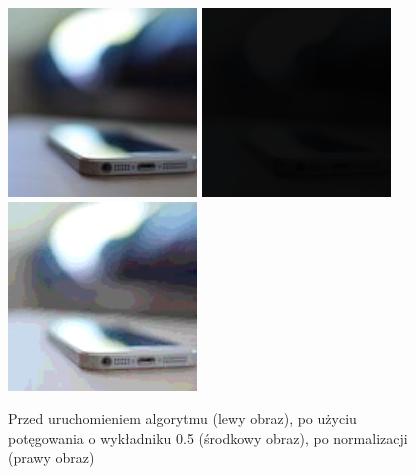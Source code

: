 \documentclass[a4paper,12pt]{book}
\begin{document}
\begin{figure}[H]
	\caption{Przed uruchomieniem algorytmu (lewy obraz), po użyciu potęgowania o wykładniku 0.5 (środkowy obraz), po normalizacji (prawy obraz)}
	\includegraphics[width=5cm, height=5cm]{phone-unmodified.jpg}
	\includegraphics[width=5cm, height=5cm]{3-4/power-color-phone-5.png}
	\includegraphics[width=5cm, height=5cm]{3-4/power-color-phone-5-norm.png}
\end{figure}
\end{document}
